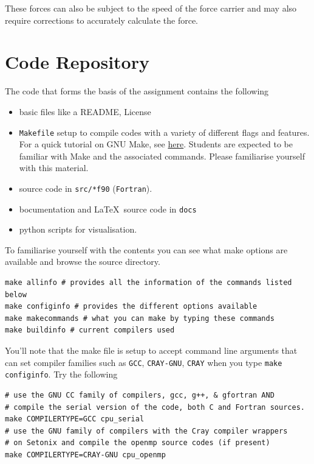\par 
These forces can also be subject to the speed of the force carrier and may also require corrections to accurately calculate the force. 

\section{Code Repository}\label{sec:code}
The code that forms the basis of the assignment contains the following 
\begin{itemize}
	\item basic files like a README, License
	\item \texttt{Makefile} setup to compile codes with a variety of different flags and features. For a quick tutorial on GNU Make, see \href{https://www.gnu.org/software/make/}{here}. Students are expected to be familiar with Make and the associated commands. Please familiarise yourself with this material. 
	\item source code in \texttt{src/*f90} (\texttt{Fortran}). 
	\item bocumentation and \LaTeX\ source code in \texttt{docs}
	\item python scripts for visualisation. 
\end{itemize}
To familiarise yourself with the contents you can see what make options are available and browse the source directory. 
\begin{center}
\begin{minipage}{0.95\textwidth}
\small
\begin{verbatim}
make allinfo # provides all the information of the commands listed below  
make configinfo # provides the different options available 
make makecommands # what you can make by typing these commands
make buildinfo # current compilers used
\end{verbatim}
\end{minipage}
\end{center}
You'll note that the make file is setup to accept command line arguments that can set compiler families such as \texttt{GCC}, \texttt{CRAY-GNU}, \texttt{CRAY} when you type \texttt{make configinfo}. Try the following
\begin{center}
\begin{minipage}{0.95\textwidth}
\small
\begin{verbatim}
# use the GNU CC family of compilers, gcc, g++, & gfortran AND 
# compile the serial version of the code, both C and Fortran sources.
make COMPILERTYPE=GCC cpu_serial 
# use the GNU family of compilers with the Cray compiler wrappers 
# on Setonix and compile the openmp source codes (if present)
make COMPILERTYPE=CRAY-GNU cpu_openmp 
\end{verbatim}
\end{minipage}
\end{center}


